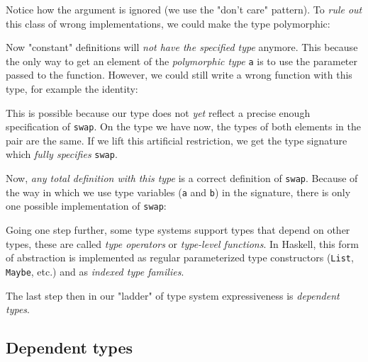 
            Notice how the argument is ignored (we use the "don't care" pattern).
            To \emph{rule out} this class of wrong implementations, we could make the type polymorphic:


            Now "constant" definitions will \emph{not have the specified type} anymore.
            This because the only way to get an element of the \emph{polymorphic type} \texttt{a}
            is to use the parameter passed to the function.
            However, we could still write a wrong function with this type, for example the identity:


            This is possible because our type does not \emph{yet} reflect a precise enough specification of \texttt{swap}.
            On the type we have now, the types of both elements in the pair are the same.
            If we lift this artificial restriction, we get the type signature which \emph{fully specifies} \texttt{swap}.


            Now, \emph{any total definition with this type} is a correct definition of \texttt{swap}.
            Because of the way in which we use type variables (\texttt{a} and \texttt{b}) in the signature,
            there is only one possible implementation of \texttt{swap}:


            Going one step further, some type systems support types that depend on other types, these are
            called \emph{type operators} or \emph{type-level functions}.
            In Haskell, this form of abstraction is implemented as regular parameterized type constructors
            (\texttt{List}, \texttt{Maybe}, etc.) and as \emph{indexed type families}.

            The last step then in our "ladder" of type system expressiveness is \emph{dependent types}.

        \subsection{Dependent types}
        \label{subsec:dependent-types}

